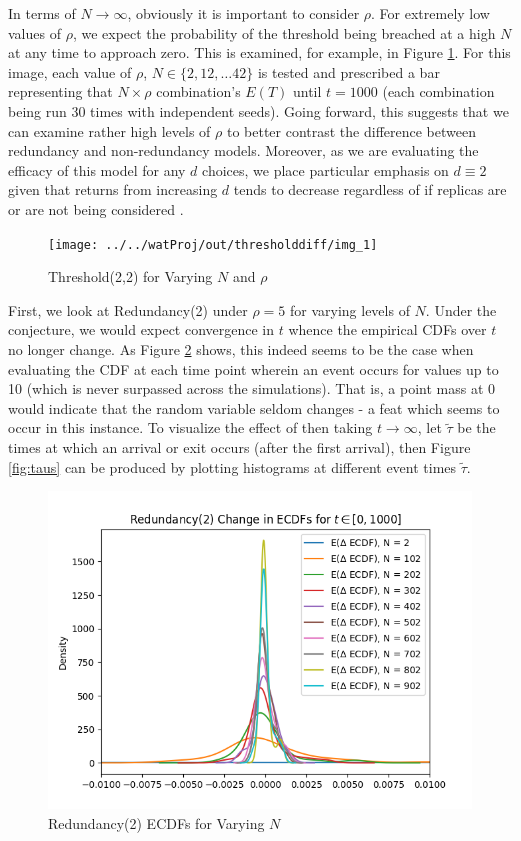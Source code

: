 In terms of $N \rightarrow \infty$, obviously it is important to consider $\rho$. For extremely low values of $\rho$, we expect the probability of the threshold being breached at a high $N$ at any time to approach zero. This is examined, for example, in Figure \ref{fig:img1}.  For this image, each value of $\rho$, $N \in \{2, 12, \dots 42\}$ is tested and prescribed a bar representing that $N \times \rho$ combination's $E(T)$ until $t=1000$ (each combination being run 30 times with independent seeds). Going forward, this suggests that  we can examine rather high levels of $\rho$ to better contrast the difference between redundancy and non-redundancy models. Moreover, as we are evaluating the efficacy of this model for any $d$ choices, we place particular emphasis on $d \equiv 2$ given that returns from increasing $d$ tends to decrease regardless of if replicas are or are not being considered \cite{gardner_redundancy-d_2017,power}.
\begin{figure}
	\centering
	\texttt{[image: ../../watProj/out/thresholddiff/img\_1]}
	\caption{Threshold(2,2) for Varying $N$ and $\rho$}
	\label{fig:img1}
\end{figure}


First, we look at Redundancy(2) under $\rho = 5$ for varying levels of $N$. Under the conjecture, we would expect convergence in $t$ whence the empirical CDFs over $t$ no longer change. As Figure \ref{fig:redecdf} shows, this indeed seems to be the case when evaluating the CDF at each time point wherein an event occurs for values up to 10 (which is never surpassed across the simulations). That is, a point mass at $0$ would indicate that the random variable seldom changes - a feat which seems to occur  in this instance. To visualize the effect of then taking $t \rightarrow \infty$, let $\tilde{\tau}$ be the times at which an arrival or exit occurs (after the first arrival), then Figure \ref{fig:taus} can be produced by plotting histograms at different event times $\tilde{\tau}$. 

\begin{figure}
	\centering
	\includegraphics[width=0.7\linewidth]{redundancyecdf.png}
		\caption{Redundancy(2) ECDFs for Varying $N$}
	\label{fig:redecdf}
\end{figure}

